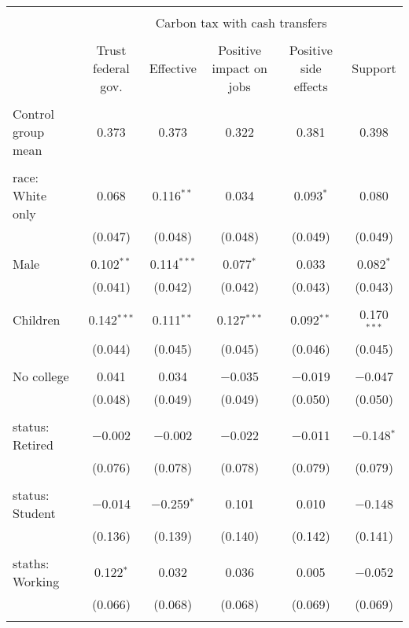 
\begin{tabular}{@{\extracolsep{5pt}}lccccc} 
\\[-1.8ex]\hline 
\hline \\[-1.8ex] 
 & \multicolumn{5}{c}{Carbon tax with cash transfers} \\ 
\cline{2-6} 
\\[-1.8ex] & Trust federal gov. & Effective & Positive impact on jobs & Positive side effects & Support \\ 
\hline \\[-1.8ex] 
 Control group mean & 0.373 & 0.373 & 0.322 & 0.381 & 0.398  \\ \hline \\[-1.8ex] race: White only & 0.068 & 0.116$^{**}$ & 0.034 & 0.093$^{*}$ & 0.080 \\ 
  & (0.047) & (0.048) & (0.048) & (0.049) & (0.049) \\ 
  & & & & & \\ 
 Male & 0.102$^{**}$ & 0.114$^{***}$ & 0.077$^{*}$ & 0.033 & 0.082$^{*}$ \\ 
  & (0.041) & (0.042) & (0.042) & (0.043) & (0.043) \\ 
  & & & & & \\ 
 Children & 0.142$^{***}$ & 0.111$^{**}$ & 0.127$^{***}$ & 0.092$^{**}$ & 0.170$^{***}$ \\ 
  & (0.044) & (0.045) & (0.045) & (0.046) & (0.045) \\ 
  & & & & & \\ 
 No college & 0.041 & 0.034 & $-$0.035 & $-$0.019 & $-$0.047 \\ 
  & (0.048) & (0.049) & (0.049) & (0.050) & (0.050) \\ 
  & & & & & \\ 
 status: Retired & $-$0.002 & $-$0.002 & $-$0.022 & $-$0.011 & $-$0.148$^{*}$ \\ 
  & (0.076) & (0.078) & (0.078) & (0.079) & (0.079) \\ 
  & & & & & \\ 
 status: Student & $-$0.014 & $-$0.259$^{*}$ & 0.101 & 0.010 & $-$0.148 \\ 
  & (0.136) & (0.139) & (0.140) & (0.142) & (0.141) \\ 
  & & & & & \\ 
 staths: Working & 0.122$^{*}$ & 0.032 & 0.036 & 0.005 & $-$0.052 \\ 
  & (0.066) & (0.068) & (0.068) & (0.069) & (0.069) \\ 
  & & & & & \\ 

\end{tabular}

